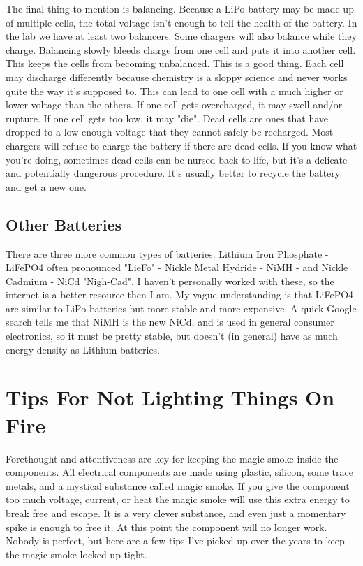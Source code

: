The final thing to mention is balancing. Because a LiPo battery may be made up of multiple cells, the total voltage isn't enough to tell the health of the battery. In the lab we have at least two balancers. Some chargers will also balance while they charge. Balancing slowly bleeds charge from one cell and puts it into another cell. This keeps the cells from becoming unbalanced. This is a good thing. Each cell may discharge differently because chemistry is a sloppy science and never works quite the way it's supposed to. This can lead to one cell with a much higher or lower voltage than the others. If one cell gets overcharged, it may swell and/or rupture. If one cell gets too low, it may "die". Dead cells are ones that have dropped to a low enough voltage that they cannot safely be recharged. Most chargers will refuse to charge the battery if there are dead cells. If you know what you're doing, sometimes dead cells can be nursed back to life, but it's a delicate and potentially dangerous procedure. It's usually better to recycle the battery and get a new one.

\subsection{Other Batteries}

There are three more common types of batteries. Lithium Iron Phosphate - LiFePO4 often pronounced "LieFo" - Nickle Metal Hydride - NiMH - and Nickle Cadmium - NiCd "Nigh-Cad". I haven't personally worked with these, so the internet is a better resource then I am. My vague understanding is that LiFePO4 are similar to LiPo batteries but more stable and more expensive. A quick Google search tells me that NiMH is the new NiCd, and is used in general consumer electronics, so it must be pretty stable, but doesn't (in general) have as much energy density as Lithium batteries.

\section{Tips For Not Lighting Things On Fire}

Forethought and attentiveness are key for keeping the magic smoke inside the components. All electrical components are made using plastic, silicon, some trace metals, and a mystical substance called magic smoke. If you give the component too much voltage, current, or heat the magic smoke will use this extra energy to break free and escape. It is a very clever substance, and even just a momentary spike is enough to free it. At this point the component will no longer work. Nobody is perfect, but here are a few tips I've picked up over the years to keep the magic smoke locked up tight.

